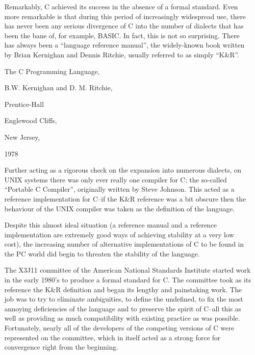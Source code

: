  

  

  Remarkably, C achieved its success in the absence of a formal
   standard. Even more remarkable is that during this period of increasingly
   widespread use, there has never been any serious divergence of C into the
   number of dialects that has been the bane of, for example, BASIC. In fact,
   this is not so surprising. There has always been a ``language reference
   manual'', the widely-known book written by Brian Kernighan and Dennis
   Ritchie, usually referred to as simply ``K\&R''.


  

   The C Programming Language,

   B.W. Kernighan and D. M. Ritchie,

   Prentice-Hall

   Englewood Cliffs,

   New Jersey,

   1978

  


  Further acting as a rigorous check on the expansion into numerous
   dialects, on UNIX systems there was only ever really one compiler for C;
   the so-called ``Portable C Compiler'', originally written by
   Steve Johnson. This acted as a reference implementation for C--if
   the K\&R reference was a bit obscure then the behaviour of the UNIX
   compiler was taken as the definition of the language.


  Despite this almost ideal situation (a reference manual and a reference
   implementation are extremely good ways of achieving stability at a very low
   cost), the increasing number of alternative implementations of C to be
   found in the PC world did begin to threaten the stability of the
   language.


  The X3J11 committee of the American National Standards Institute started
   work in the early 1980's to produce a formal standard for C. The committee
   took as its reference the K\&R definition and began its lengthy and
   painstaking work. The job was to try to eliminate ambiguities, to define
   the undefined, to fix the most annoying deficiencies of the language and to
   preserve the spirit of C--all this as well as providing as much
   compatibility with existing practice as was possible. Fortunately, nearly
   all of the developers of the competing versions of C were represented on
   the committee, which in itself acted as a strong force for convergence
   right from the beginning.


